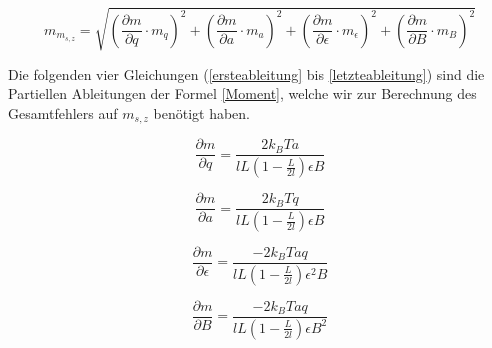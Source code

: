 \documentclass[a4paper,parskip,11pt, DIV12]{scrreprt}
\begin{document}
\begin{equation} \label{Gauss}
m_{m_{s,z}}=\sqrt{(\frac{\partial m}{\partial q} \cdot m_q)^2+(\frac{\partial m}{\partial a} \cdot m_a)^2+(\frac{\partial m}{\partial \epsilon} \cdot m_\epsilon)^2+(\frac{\partial m}{\partial B} \cdot m_B)^2}
\end{equation}

Die folgenden vier Gleichungen (\ref{ersteableitung} bis \ref{letzteableitung}) sind die Partiellen Ableitungen der Formel \ref{Moment}, welche wir zur Berechnung des Gesamtfehlers auf $m_{s,z}$ benötigt haben.

\begin{equation} \label{ersteableitung}
\frac{\partial m}{\partial q} = \frac{2k_BTa}{lL(1-\frac{L}{2l})\epsilon B}
\end{equation}

\begin{equation}
\frac{\partial m}{\partial a} = \frac{2k_BTq}{lL(1-\frac{L}{2l})\epsilon B}
\end{equation}

\begin{equation}
\frac{\partial m}{\partial \epsilon} = \frac{-2k_BTaq}{lL(1-\frac{L}{2l})\epsilon^2 B}
\end{equation}

\begin{equation} \label{letzteableitung}
\frac{\partial m}{\partial B} = \frac{-2k_BTaq}{lL(1-\frac{L}{2l})\epsilon B^2}
\end{equation}


\clearpage
 

\end{document}
